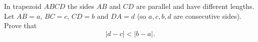 In trapezoid $ABCD$ the sides $AB$ and $CD$ are parallel and have different lengths. Let $AB=a$, $BC=c$, $CD=b$ and $DA=d$ (so $a,c,b,d$ are consecutive sides). Prove that
\[
|d-c|<|b-a| .
\]
